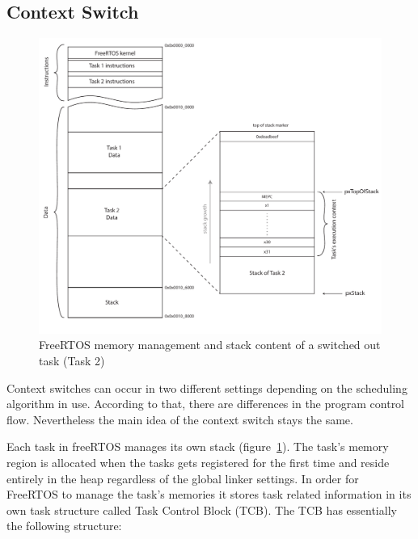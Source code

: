 \subsection{Context Switch}

\begin{figure}[t]
 \centering
 \includegraphics[width=\linewidth]{./figures/freertos_memorymap}
 \caption{FreeRTOS memory management and stack content of a switched out task (Task 2)}
 \label{fig:memory_management}
\end{figure}

Context switches can occur in two different settings depending on the scheduling algorithm in use. According to that, there are differences in the program control flow. Nevertheless the main idea of the context switch stays the same.

Each task in freeRTOS manages its own stack (figure~\ref{fig:memory_management}). The task's memory region is allocated when the tasks gets registered for the first time and reside entirely in the heap regardless of the global linker settings. In order for FreeRTOS to manage the task's memories it stores task related information in its own task structure called Task Control Block (TCB). The TCB has essentially the following structure:

